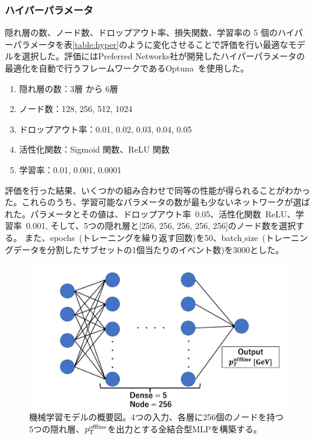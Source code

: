 \subsubsection{ハイパーパラメータ}
隠れ層の数、ノード数、ドロップアウト率、損失関数、学習率の 5 個のハイパーパラメータを表\ref{table:hyper}のように変化させることで評価を行い最適なモデルを選択した。評価にはPreferred Networks社が開発したハイパーパラメータの最適化を自動で行うフレームワークであるOptuna~\cite{article:optuna}を使用した。
\begin{enumerate}\label{table:hyper}
   \item 隠れ層の数：3層 から 6層
   \item ノード数：128, 256, 512, 1024
   \item ドロップアウト率：0.01, 0.02, 0.03, 0.04, 0.05
   \item 活性化関数：Sigmoid 関数、ReLU 関数
   \item 学習率：0.01, 0.001, 0.0001
\end{enumerate}
評価を行った結果、いくつかの組み合わせで同等の性能が得られることがわかった。これらのうち、学習可能なパラメータの数が最も少ないネットワークが選ばれた。パラメータとその値は、ドロップアウト率~0.05、活性化関数~ReLU、学習率~0.001, そして、5つの隠れ層と[256, 256, 256, 256, 256]のノード数を選択する。
また、epochs~(トレーニングを繰り返す回数)を50、batch$\_$size~(トレーニングデータを分割したサブセットの1個当たりのイベント数)を3000とした。

\begin{figure}[tb]
  \centering
  \includegraphics[clip, width=12cm]{fig/4/MLP_2.pdf}
  \caption{機械学習モデルの概要図。4つの入力、各層に256個のノードを持つ5つの隠れ層、$p_{\rm{T}}^{\rm{offline}}$を出力とする全結合型MLPを構築する。}
  \label{fig:MLP_overview}
\end{figure}



